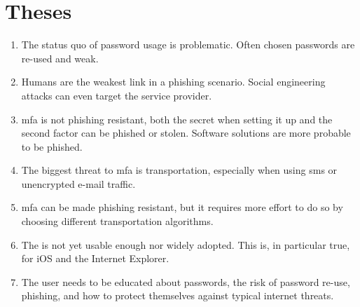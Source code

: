 \chapter*{Theses}
\thispagestyle{noheader}

\begin{enumerate}
	\setlength{\itemsep}{1cm}
	\item The status quo of password usage is problematic. Often chosen passwords are re-used and weak.
	\item Humans are the weakest link in a phishing scenario. Social engineering attacks can even target the service provider.
	\item \Glsdesc{mfa} is not phishing resistant, both the secret when setting it up and the second factor can be phished or stolen. Software solutions are more probable to be phished.
	\item The biggest threat to \glsdesc{mfa} is transportation, especially when using \gls{sms} or unencrypted e-mail traffic.
	\item \Glsdesc{mfa} can be made phishing resistant, but it requires more effort to do so by choosing different transportation algorithms.
	\item The \wa{} is not yet usable enough nor widely adopted. This is, in particular true, for iOS and the Internet Explorer.
	\item The user needs to be educated about passwords, the risk of password re-use, phishing, and how to protect themselves against typical internet threats.
\end{enumerate}
